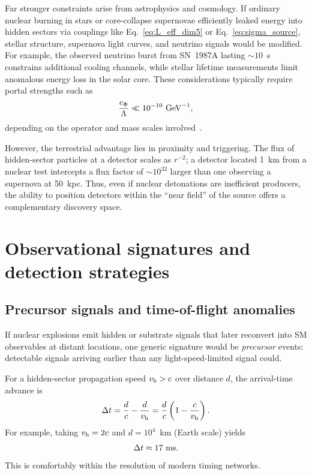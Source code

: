 \documentclass[aps,prd,twocolumn,nofootinbib,superscriptaddress]{revtex4-2}
\begin{document}
Far stronger constraints arise from astrophysics and cosmology. If ordinary nuclear burning in stars or core-collapse supernovae efficiently leaked energy into hidden sectors via couplings like Eq.~\eqref{eq:L_eff_dim5} or Eq.~\eqref{eq:sigma_source}, stellar structure, supernova light curves, and neutrino signals would be modified. For example, the observed neutrino burst from SN~1987A lasting $\sim 10$~s constrains additional cooling channels, while stellar lifetime measurements limit anomalous energy loss in the solar core. These considerations typically require portal strengths such as
\begin{equation}
    \frac{c_{\Phi}}{\Lambda} \ll 10^{-10}~{\rm GeV}^{-1},
\end{equation}
depending on the operator and mass scales involved~\cite{Raffelt}.

However, the terrestrial advantage lies in proximity and triggering. The flux of hidden-sector particles at a detector scales as $r^{-2}$; a detector located 1~km from a nuclear test intercepts a flux factor of $\sim 10^{32}$ larger than one observing a supernova at 50~kpc. Thus, even if nuclear detonations are inefficient producers, the ability to position detectors within the ``near field'' of the source offers a complementary discovery space.

\section{Observational signatures and detection strategies}
\label{sec:observables}

\subsection{Precursor signals and time-of-flight anomalies}

If nuclear explosions emit hidden or substrate signals that later reconvert into SM observables at distant locations, one generic signature would be \emph{precursor} events: detectable signals arriving earlier than any light-speed-limited signal could.

For a hidden-sector propagation speed $v_{\rm h} > c$ over distance $d$, the arrival-time advance is
\begin{equation}
    \Delta t = \frac{d}{c} - \frac{d}{v_{\rm h}}
    = \frac{d}{c} \left(1 - \frac{c}{v_{\rm h}}\right).
\end{equation}
For example, taking $v_{\rm h} = 2c$ and $d = 10^4$~km (Earth scale) yields
\begin{equation}
    \Delta t \approx 17~{\rm ms}.
\end{equation}
This is comfortably within the resolution of modern timing networks.
\end{document}
